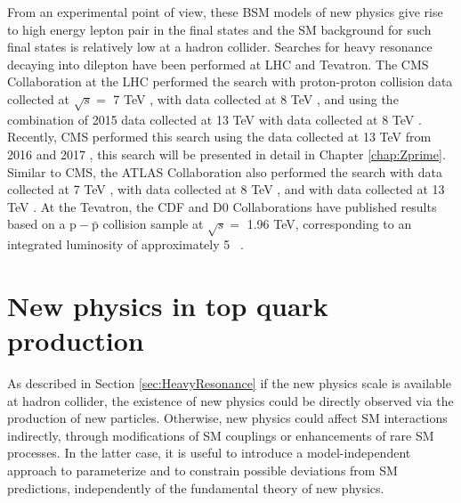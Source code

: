 From an experimental point of view, these BSM models of new physics give rise to high energy lepton pair in the final states and the SM background for such final states is relatively low at a hadron collider. Searches for heavy resonance decaying into dilepton have been performed at LHC and Tevatron. The CMS Collaboration at the LHC performed the search with proton-proton collision data collected at $\sqrt{s}=$ 7 TeV \cite{Chatrchyan:2011wq,Chatrchyan:2012it}, with data collected at 8 TeV \cite{Chatrchyan:2012oaa,Khachatryan:2014fba}, and using the combination of 2015 data collected at 13 TeV with data collected at 8 TeV \cite{Khachatryan:2016zqb}.
Recently, CMS performed this search using the data collected at 13 TeV from 2016 \cite{Sirunyan2018} and 2017 \cite{CMS-PAS-EXO-18-006}, this search will be presented in detail in Chapter \ref{chap:Zprime}. Similar to CMS, the ATLAS Collaboration also performed the search with data collected at 7 TeV \cite{Aad:2011xp,Aad:2012hf}, with data collected at 8 TeV \cite{Aad:2014cka}, and with data collected at 13 TeV \cite{Aaboud:2017buh,Aad:2019fac}. At the Tevatron, the CDF and D0 Collaborations have published results based on a $\mathrm{p-\bar{p}}$ collision sample at $\sqrt{s} =$ 1.96 TeV, corresponding to an integrated luminosity of approximately 5 \fbinv~\cite{CDF_Zp,CDF_RS,D0_RS,D0_Zp,CDF_SSM,CDF_RSele}.








\section{New physics in top quark production}\label{tW_Int}

As described in Section \ref{sec:HeavyResonance} if the new physics scale is available at hadron collider, the existence of new physics could be directly observed via the production of new particles.
Otherwise, new physics could affect SM interactions indirectly,
through modifications of SM couplings or enhancements of rare SM processes.
In the latter case, it is useful to introduce a model-independent approach to parameterize and to
constrain possible deviations from SM predictions, independently of the fundamental theory of new physics.

